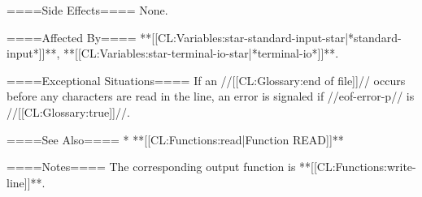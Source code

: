 ====Side Effects====
None.

====Affected By====
**[[CL:Variables:star-standard-input-star|*standard-input*]]**, **[[CL:Variables:star-terminal-io-star|*terminal-io*]]**.

====Exceptional Situations====
If an //[[CL:Glossary:end of file]]// occurs before any characters are read in the line, an error is signaled if //eof-error-p// is //[[CL:Glossary:true]]//.

====See Also====
  * **[[CL:Functions:read|Function READ]]**

====Notes====
The corresponding output function is **[[CL:Functions:write-line]]**.


